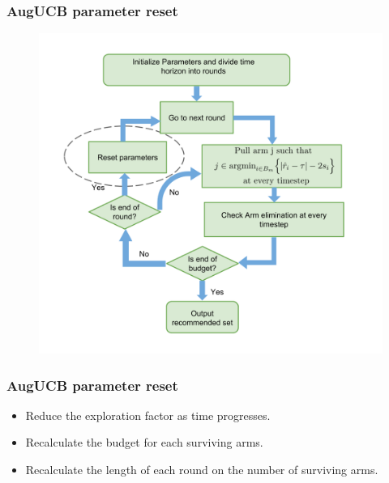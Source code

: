\begin{frame}
\frametitle{AugUCB parameter reset}
\begin{figure}
\includegraphics[scale=0.24]{img/AugUCB_flow_reset.png}
\end{figure}
\end{frame}


\begin{frame}
\frametitle{AugUCB parameter reset}
\begin{itemize}
\item<1-> Reduce the exploration factor as time progresses.
\item<2-> Recalculate the budget for each surviving arms.
\item<3-> Recalculate the length of each round on the number of surviving arms.
\end{itemize}
\end{frame}

